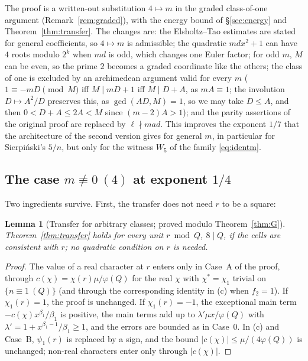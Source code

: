 \documentclass[11pt,reqno]{amsart}
\newtheorem{lemma}[theorem]{Lemma}
\theoremstyle{definition}
\begin{document}
The proof \cite[Cor.~6.1 and \S6b]{MN} is a written-out substitution
$4\mapsto m$ in the graded class-of-one argument (Remark~\ref{rem:graded}), with
the energy bound of \S\ref{sec:energy} and Theorem~\ref{thm:transfer}.  The
changes are: the Elsholtz--Tao estimates are stated for general
coefficients, so $4\mapsto m$ is admissible; the quadratic $mdx^2+1$ can have $4$
roots modulo $2^k$ when $md$ is odd, which changes one Euler factor; for odd $m$,
$M$ can be even, so the prime $2$ becomes a graded coordinate like the others;
the class of one is excluded by an archimedean argument valid for every $m$
($1\equiv-mD\pmod M$ iff $M\mid mD+1$ iff $M\mid D+A$, as $mA\equiv1$; the involution
$D\mapsto A^2/D$ preserves this, as $\gcd(AD,M)=1$, so we may take $D\le A$, and then
$0<D+A\le2A<M$ since $(m-2)A>1$); and the parity
assertions of the original proof are replaced by $\ell\nmid mad$.  This improves the
exponent $1/7$ that the architecture of the second version gives for
general $m$, in particular for Sierpi\'nski's $5/n$, but only for the witness
$W_5$ of the family \eqref{eq:identm}.

\subsection*{The case \texorpdfstring{$m\not\equiv0\ (4)$}{m not 0 mod 4} at exponent \texorpdfstring{$1/4$}{1/4}}
Two ingredients survive.  First, the transfer does not need $r$ to be a square:

\begin{lemma}[Transfer for arbitrary classes; proved modulo Theorem~\ref{thm:G}]\label{lem:anyr}
Theorem~\ref{thm:transfer} holds for every unit $r\bmod Q$, $8\mid Q$, if the cells are
consistent with $r$; no quadratic condition on $r$ is needed.
\end{lemma}

\begin{proof}
The value of a real character at $r$ enters only in Case~A of the proof, through
$c(\chi)=\chi(r)\mu/\varphi(Q)$ for the real $\chi$ with $\chi^*=\chi_1$ trivial on
$\{n\equiv1\ (Q)\}$ (and through the corresponding identity in (c) when $f_2=1$).  If
$\chi_1(r)=1$, the proof is unchanged.  If $\chi_1(r)=-1$, the exceptional main
term $-c(\chi)x^{\beta_1}/\beta_1$ is positive, the main terms add up to
$\lambda'\mu x/\varphi(Q)$ with $\lambda'=1+x^{\beta_1-1}/\beta_1\ge1$, and the errors are bounded
as in Case~0.  In (c) and Case~B, $\psi_1(r)$ is replaced by a sign, and the
bound $|c(\chi)|\le\mu/(4\varphi(Q))$ is unchanged; non-real characters enter only
through $|c(\chi)|$.
\end{proof}
\end{document}
